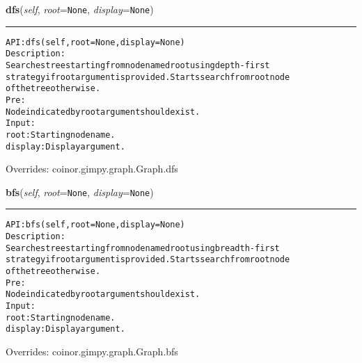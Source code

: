     \vspace{0.5ex}

\hspace{.8\funcindent}\begin{boxedminipage}{\funcwidth}

    \raggedright \textbf{dfs}(\textit{self}, \textit{root}={\tt None}, \textit{display}={\tt None})

    \vspace{-1.5ex}

    \rule{\textwidth}{0.5\fboxrule}
\setlength{\parskip}{2ex}
\begin{alltt}

API: dfs(self, root = None, display = None)
Description:
    Searches tree starting from node named root using depth-first
    strategy if root argument is provided. Starts search from root node
    of the tree otherwise.
Pre:
    Node indicated by root argument should exist.
Input:
    root: Starting node name.
    display: Display argument.
\end{alltt}

\setlength{\parskip}{1ex}
      Overrides: coinor.gimpy.graph.Graph.dfs

    \end{boxedminipage}

    \vspace{0.5ex}

\hspace{.8\funcindent}\begin{boxedminipage}{\funcwidth}

    \raggedright \textbf{bfs}(\textit{self}, \textit{root}={\tt None}, \textit{display}={\tt None})

    \vspace{-1.5ex}

    \rule{\textwidth}{0.5\fboxrule}
\setlength{\parskip}{2ex}
\begin{alltt}

API: bfs(self, root = None, display = None)
Description:
    Searches tree starting from node named root using breadth-first
    strategy if root argument is provided. Starts search from root node
    of the tree otherwise.
Pre:
    Node indicated by root argument should exist.
Input:
    root: Starting node name.
    display: Display argument.
\end{alltt}

\setlength{\parskip}{1ex}
      Overrides: coinor.gimpy.graph.Graph.bfs

    \end{boxedminipage}

